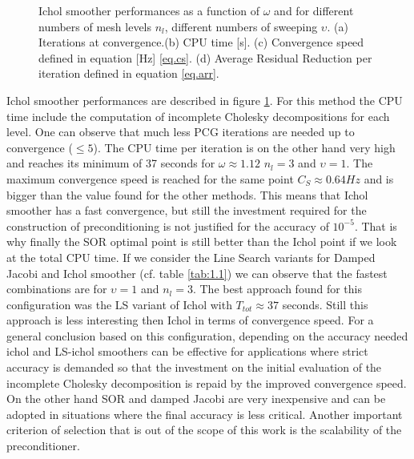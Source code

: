 \begin{figure}[hbt!]
{                                  }
                          \caption{Ichol smoother performances as a function of $\omega$ and for different numbers of mesh levels $n_l$, different numbers of sweeping $\upsilon$. (a) Iterations at convergence.(b) CPU time [s]. (c) Convergence speed defined in equation [Hz] \eqref{eq.cs}. (d) Average Residual Reduction per iteration defined in equation \eqref{eq.arr}. }
                          \label{f.1.34}
                        \end{figure}  
                        Ichol smoother performances are described in figure \ref{f.1.34}.  For this method the CPU time include the computation of incomplete Cholesky decompositions for each level. One can observe that much less PCG iterations are needed up to convergence ($\leq 5$). The CPU time per iteration is on the other hand very high and reaches its minimum of 37 seconds for $\omega\approx1.12$ $n_l=3$ and $\upsilon=1$. The maximum convergence speed is reached for the same point $C_S\approx 0.64 Hz$ and is bigger than the value found for the other methods. This means that Ichol smoother has a fast convergence, but still the investment required for the construction of preconditioning is not justified for the accuracy of $10^{-5}$. That is why finally the SOR optimal point is still better than the Ichol point if we look at the total CPU time. If we consider the Line Search variants for Damped Jacobi and Ichol smoother (cf. table \ref{tab:1.1}) we can observe that the fastest combinations are for $\upsilon=1$ and $n_l=3$. The best approach found for this configuration was the LS variant of Ichol with $T_{tot}\approx 37$ seconds. Still this approach is less interesting then Ichol in terms of convergence speed. For a general conclusion based on this configuration, depending on the accuracy needed ichol and LS-ichol smoothers can be effective for applications where strict accuracy is demanded so that the investment on the initial evaluation of the incomplete Cholesky decomposition is repaid by the improved convergence speed. On the other hand SOR and damped Jacobi are very inexpensive and can be adopted in situations where the final accuracy is less critical. Another important criterion of selection that is out of the scope of this work is the scalability of the preconditioner.
